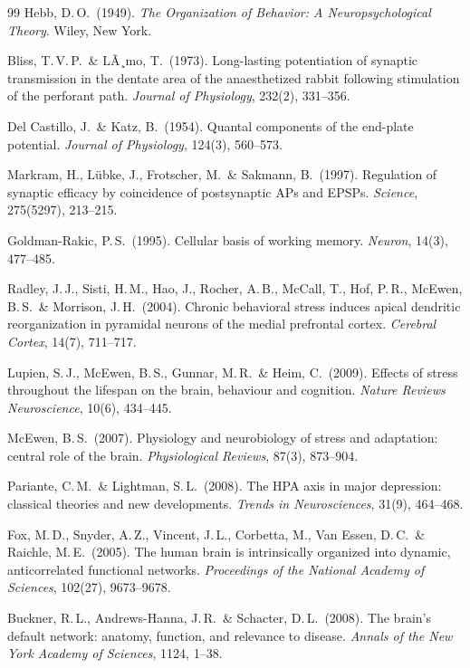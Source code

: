 ﻿\documentclass[a4paper,12pt]{article}
\theoremstyle{definition}
\begin{document}
\begin{thebibliography}{99}
	Hebb, D.\,O.\ (1949).
	\textit{The Organization of Behavior: A Neuropsychological Theory}.
	Wiley, New York.

	Bliss, T.\,V.\,P.\ \& LÃ¸mo, T.\ (1973).
	Long-lasting potentiation of synaptic transmission in the dentate area of the anaesthetized rabbit following stimulation of the perforant path.
	\textit{Journal of Physiology}, 232(2), 331--356.

	Del Castillo, J.\ \& Katz, B.\ (1954).
	Quantal components of the end-plate potential.
	\textit{Journal of Physiology}, 124(3), 560--573.

	Markram, H., Lübke, J., Frotscher, M.\ \& Sakmann, B.\ (1997).
	Regulation of synaptic efficacy by coincidence of postsynaptic APs and EPSPs.
	\textit{Science}, 275(5297), 213--215.

	Goldman-Rakic, P.\,S.\ (1995).
	Cellular basis of working memory.
	\textit{Neuron}, 14(3), 477--485.

	Radley, J.\,J., Sisti, H.\,M., Hao, J., Rocher, A.\,B., McCall, T., Hof, P.\,R., McEwen, B.\,S.\ \& Morrison, J.\,H.\ (2004).
	Chronic behavioral stress induces apical dendritic reorganization in pyramidal neurons of the medial prefrontal cortex.
	\textit{Cerebral Cortex}, 14(7), 711--717.

	Lupien, S.\,J., McEwen, B.\,S., Gunnar, M.\,R.\ \& Heim, C.\ (2009).
	Effects of stress throughout the lifespan on the brain, behaviour and cognition.
	\textit{Nature Reviews Neuroscience}, 10(6), 434--445.

	McEwen, B.\,S.\ (2007).
	Physiology and neurobiology of stress and adaptation: central role of the brain.
	\textit{Physiological Reviews}, 87(3), 873--904.

	Pariante, C.\,M.\ \& Lightman, S.\,L.\ (2008).
	The HPA axis in major depression: classical theories and new developments.
	\textit{Trends in Neurosciences}, 31(9), 464--468.

	Fox, M.\,D., Snyder, A.\,Z., Vincent, J.\,L., Corbetta, M., Van Essen, D.\,C.\ \& Raichle, M.\,E.\ (2005).
	The human brain is intrinsically organized into dynamic, anticorrelated functional networks.
	\textit{Proceedings of the National Academy of Sciences}, 102(27), 9673--9678.

	Buckner, R.\,L., Andrews-Hanna, J.\,R.\ \& Schacter, D.\,L.\ (2008).
	The brain's default network: anatomy, function, and relevance to disease.
	\textit{Annals of the New York Academy of Sciences}, 1124, 1--38.


\end{thebibliography}
\end{document}
